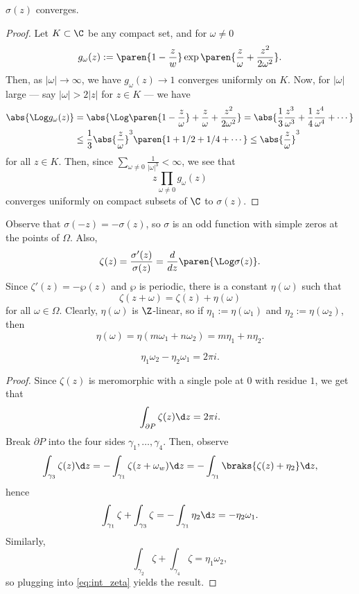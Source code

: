 \documentclass[11pt]{report}
\begin{document}
\begin{prop}
    $\sigma(z)$ converges.
\end{prop}

\begin{proof}
    Let $K \subset \C$ be any compact set, and for $\omega \neq 0$ 
    $$g_\omega(z) :=\paren{1 - \frac zw}\exp\paren{\frac{z}{\omega} + \frac{z^2}{2\omega^2} }.$$
    Then, as $|\omega| \to \infty$, we have $g_\omega(z) \to 1$ converges uniformly on $K$. Now, for $|\omega|$ large --- say $|\omega| > 2|z|$ for $z \in K$ --- we have
    \begin{align*}
        \abs{\Log g_\omega(z)} &= \abs{\Log\paren{1-\frac{z}{\omega}}+\frac{z}{\omega}+\frac{z^2}{2\omega^2}}=\abs{\frac{1}{3}\frac{z^3}{\omega^3} +\frac{1}{4}\frac{z^4}{\omega^4}+\cdots}
        \\ & \leq \frac{1}{3}\abs{\frac{z}{\omega}}^3 \paren{1+ 1/2 + 1/4 + \cdots} \leq \abs{\frac{z}{\omega}}^3
    \end{align*}
    for all $z \in K$. Then, since $\sum_{\omega \neq 0}\frac{1}{|\omega|^3}<\infty$, we see that 
    $$z\prod_{\omega \neq 0}g_\omega(z)$$
    converges uniformly on compact subsets of $\C$ to $\sigma(z)$.
\end{proof}

\begin{rmk}
    Observe that $\sigma(-z) = -\sigma(z)$, so $\sigma$ is an odd function with simple zeros at the points of $\Omega$. Also,
    $$\zeta(z) = \frac{\sigma'(z)}{\sigma(z)}=\frac{d}{dz}\paren{\Log\sigma (z)}.$$
    Since $\zeta'(z)=-\wp(z)$ and $\wp$ is periodic, there is a constant $\eta(\omega)$ such that
    $$\zeta(z+\omega)=\zeta(z) + \eta(\omega)$$
    for all $\omega \in \Omega$. Clearly, $\eta(\omega)$ is $\Z$-linear, so if $\eta_1:=\eta(\omega_1)$ and $\eta_2:=\eta(\omega_2)$, then
    $$\eta(\omega) = \eta(m \omega_1 + n\omega_2) = m\eta_1 + n \eta_2.$$
\end{rmk}

\begin{thm}
    $$\eta_1\omega_2 - \eta_2\omega_1 = 2\pi i.$$
\end{thm}

\begin{proof}
    Since $\zeta(z)$ is meromorphic with a single pole at $0$ with residue $1$, we get that
    \begin{align} \label{eq:int_zeta}
        \int_{\partial P}\zeta(z) \d z = 2\pi i.
    \end{align}
    Break $\partial P$ into the four sides $\gamma_1,\dots,\gamma_4$. Then, observe
    \begin{align*}
        \int_{\gamma_3}\zeta(z)\d z = -\int_{\gamma_1} \zeta(z+\omega_w)\d z = -\int_{\gamma_1}\braks{\zeta(z) + \eta_2}\d z,
    \end{align*}
    hence
    $$\int_{\gamma_1}\zeta + \int_{\gamma_3}\zeta = -\int_{\gamma_1}\eta_2\d z = -\eta_2\omega_1.$$
    Similarly,
    $$\int_{\gamma_2}\zeta + \int_{\gamma_4}\zeta = \eta_1\omega_2,$$
    so plugging into \eqref{eq:int_zeta} yields the result.
\end{proof}
\end{document}
